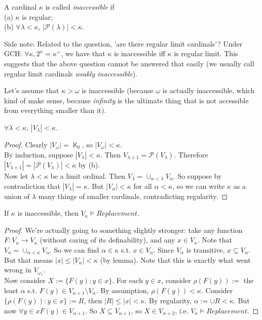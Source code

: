 \documentclass[a4paper]{article}
\begin{document}
\begin{defi}
A cardinal $\kappa$ is called \emph{inaccessible} if\\
(a) $\kappa$ is regular;\\
(b) $\forall \lambda < \kappa$, $|\mathcal{P}(\lambda)| < \kappa$.
\end{defi}

Side note: Related to the question, 'are there regular limit cardinals'? Under GCH: $\forall \kappa, 2^\kappa = \kappa^+$, we have that $\kappa$ is inaccessible iff $\kappa$ is regular limit. This suggests that the above question cannot be answered that easily (we usually call regular limit cardinals \emph{weakly inaccessible}).

Let's assume that $\kappa>\omega$ is inaccessible (because $\omega$ is actually inaccessible, which kind of make sense, because \emph{infinity} is the ultimate thing that is not accessible from everything smaller than it).

\begin{lemma}
$\forall \lambda < \kappa$, $|V_\lambda| < \kappa$.
\begin{proof}
Clearly $|V_\omega| = \aleph_0$, so $|V_\omega| < \kappa$.\\
By induction, suppose $|V_\lambda| < \kappa$. Then $V_{\lambda+1} = \mathcal{P}(V_\lambda)$. Therefore $|V_{\lambda+1}| = |\mathcal{P}(V_\lambda)| < \kappa$ by (b).\\
Now let $\lambda < \kappa$ be a limit ordinal. Then $V_\lambda = \cup_{\alpha < \lambda} V_\alpha$. So suppose by contradiction that $|V_\lambda| = \kappa$. But $|V_\alpha| < \kappa$ for all $\alpha < \kappa$, so we can write $\kappa$ as a union of $\lambda$ many things of smaller cardinals, contradicting regularity.
\end{proof}
\end{lemma}

\begin{thm}
If $\kappa$ is inaccessible, then $V_\kappa \vDash Replacement$.
\begin{proof}
We're actually going to something slightly stronger: take any function $F:V_\kappa \to V_\kappa$ (without caring of its definability), and any $x \in V_\kappa$. Note that $V_\kappa = \cup_{\alpha < \kappa} V_\alpha$. So we can find $\alpha \in \kappa$ s.t. $x \in V_\alpha$. Since $V_\alpha$ is transitive, $x \subseteq V_\alpha$. But that means $|x| \leq |V_\alpha| < \kappa$ (by lemma). Note that this is exactly what went wrong in $V_{\omega_1}$.\\
Now consider $X:=\{F(y):y \in x\}$. For each $y \in x$, consider $\rho(F(y)):=$ the least $\alpha$ s.t. $F(y) \in V_{\alpha+1} \setminus V_\alpha$. By assumption, $\rho(F(y)) < \kappa$. Consider $\{\rho(F(y)):y \in x\} := R$, then $|R| \leq |x| < \kappa$. By regularity, $\alpha := \cup R < \kappa$. But now $\forall y \in x F(y) \in V_{\alpha+1}$. So $X \subseteq V_{\alpha+1}$, so $X \in V_{\alpha+2}$, i.e. $V_\kappa \vDash Replacement$.
\end{proof}
\end{thm}
\end{document}
